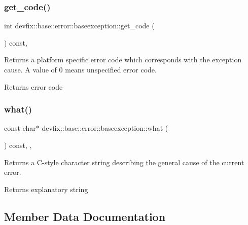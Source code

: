 \subsubsection{\texorpdfstring{get\+\_\+code()}{get\_code()}}
{\footnotesize\ttfamily int devfix\+::base\+::error\+::baseexception\+::get\+\_\+code (\begin{DoxyParamCaption}{ }\end{DoxyParamCaption}) const\hspace{0.3cm}{\ttfamily [inline]}, {\ttfamily [noexcept]}}



Returns a platform specific error code which corresponds with the exception cause. A value of \textquotesingle{}0\textquotesingle{} means unspecified error code. 

\begin{DoxyReturn}{Returns}
error code 
\end{DoxyReturn}
\mbox{\label{structdevfix_1_1base_1_1error_1_1baseexception_a16327152a55d65b1e537825231fbd452}} 
\subsubsection{\texorpdfstring{what()}{what()}}
{\footnotesize\ttfamily const char$\ast$ devfix\+::base\+::error\+::baseexception\+::what (\begin{DoxyParamCaption}{ }\end{DoxyParamCaption}) const\hspace{0.3cm}{\ttfamily [inline]}, {\ttfamily [final]}, {\ttfamily [noexcept]}}

Returns a C-\/style character string describing the general cause of the current error. \begin{DoxyReturn}{Returns}
explanatory string 
\end{DoxyReturn}


\subsection{Member Data Documentation}
\mbox{\label{structdevfix_1_1base_1_1error_1_1baseexception_aa1f58eb33d67ccf87465656f20b6d640}} 
